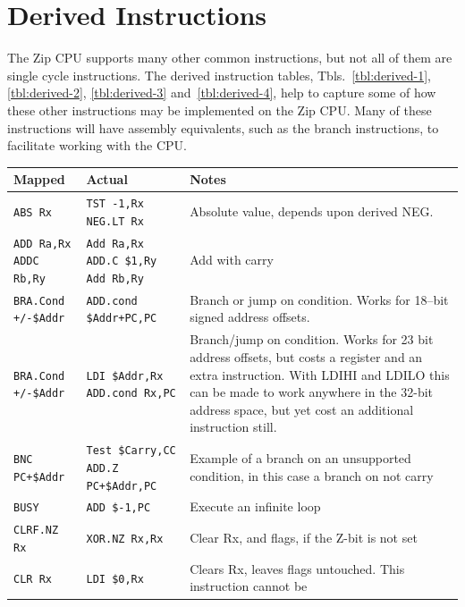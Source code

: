 \documentclass{gqtekspec}
\begin{document}
\section{Derived Instructions}
The Zip CPU supports many other common instructions, but not all of them
are single cycle instructions.  The derived instruction tables,
Tbls.~\ref{tbl:derived-1}, \ref{tbl:derived-2}, \ref{tbl:derived-3} 
and~\ref{tbl:derived-4},
help to capture some of how these other instructions may be implemented on
the Zip CPU.  Many of these instructions will have assembly equivalents,
such as the branch instructions, to facilitate working with the CPU.
\begin{table}\begin{center}
\begin{tabular}{p{1.4in}p{1.5in}p{3in}}\\\hline
Mapped & Actual  & Notes \\\hline
{\tt ABS Rx}
	& \parbox[t]{1.5in}{\tt TST -1,Rx\\NEG.LT Rx}
	& Absolute value, depends upon derived NEG.\\\hline
\parbox[t]{1.4in}{\tt ADD Ra,Rx\\ADDC Rb,Ry}
	& \parbox[t]{1.5in}{\tt Add Ra,Rx\\ADD.C \$1,Ry\\Add Rb,Ry}
	& Add with carry \\\hline
{\tt BRA.Cond +/-\$Addr}
	& \hbox{\tt ADD.cond \$Addr+PC,PC}
	& Branch or jump on condition.  Works for 18--bit
		signed address offsets.\\\hline
{\tt BRA.Cond +/-\$Addr}
	& \parbox[t]{1.5in}{\tt LDI \$Addr,Rx \\ ADD.cond Rx,PC}
	& Branch/jump on condition.  Works for 23 bit address offsets, but
	costs a register and an extra instruction.  With LDIHI and LDILO
	this can be made to work anywhere in the 32-bit address space, but yet
	cost an additional instruction still. \\\hline
{\tt BNC PC+\$Addr}
	& \parbox[t]{1.5in}{\tt Test \$Carry,CC \\ ADD.Z PC+\$Addr,PC}
	& Example of a branch on an unsupported
		condition, in this case a branch on not carry \\\hline
{\tt BUSY } & {\tt ADD \$-1,PC} & Execute an infinite loop \\\hline
{\tt CLRF.NZ Rx }
	& {\tt XOR.NZ Rx,Rx}
	& Clear Rx, and flags, if the Z-bit is not set \\\hline
{\tt CLR Rx }
	& {\tt LDI \$0,Rx}
	& Clears Rx, leaves flags untouched.  This instruction cannot be

\end{tabular}
\end{center}
\end{table}
\end{document}
